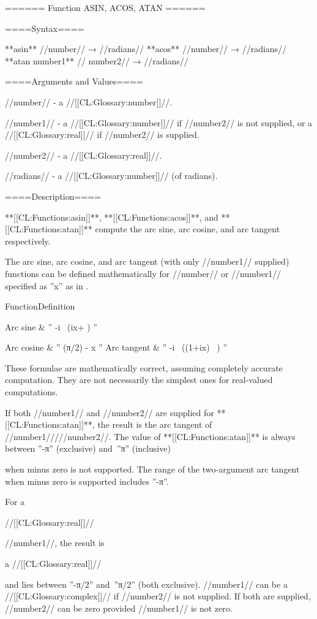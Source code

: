 ====== Function ASIN, ACOS, ATAN ======

====Syntax====

**asin** //number// → //radians// **acos** //number// → //radians// **atan {number1** //\opt} number2// → //radians//

====Arguments and Values====

//number// - a //[[CL:Glossary:number]]//.

//number1// - a //[[CL:Glossary:number]]// if //number2// is not supplied, or a //[[CL:Glossary:real]]// if //number2// is supplied.

//number2// - a //[[CL:Glossary:real]]//.

//radians// - a //[[CL:Glossary:number]]// (of radians).

====Description====

**[[CL:Functions:asin]]**, **[[CL:Functions:acos]]**, and **[[CL:Functions:atan]]** compute the arc sine, arc cosine, and arc tangent respectively.

The arc sine, arc cosine, and arc tangent (with only //number1// supplied) functions can be defined mathematically for //number// or //number1// specified as ''x'' as in \thenextfigure.

 {Function}{Definition}{ Arc sine & '' -i\  \bigl(ix+  \bigr) '' \cr

Arc cosine & '' (π/2) -  x '' \cr Arc tangent & '' -i\  \bigl((1+ix)\  \bigr) '' \cr }

These formulae are mathematically correct, assuming completely accurate computation. They are not necessarily the simplest ones for real-valued computations.

If both //number1// and //number2// are supplied for **[[CL:Functions:atan]]**, the result is the arc tangent of //number1/////number2//. The value of **[[CL:Functions:atan]]** is always between ''-π'' (exclusive) and~''π'' (inclusive)

when minus zero is not supported. The range of the two-argument arc tangent when minus zero is supported includes ''-π''.


For a

//[[CL:Glossary:real]]//

//number1//, the result is

a //[[CL:Glossary:real]]//

and lies between ''-π/2'' and~''π/2'' (both exclusive). //number1// can be a //[[CL:Glossary:complex]]// if //number2// is not supplied. If both are supplied, //number2// can be zero provided //number1// is not zero. 

